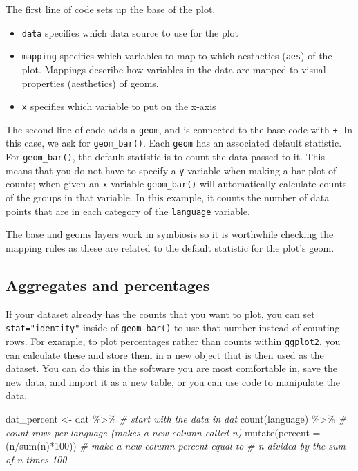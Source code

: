 \documentclass[
  english,
  doc,floatsintext]{apa6}
\newenvironment{Shaded}{\begin{snugshade}}{\end{snugshade}}
\newcommand{\AttributeTok}[1]{\textcolor[rgb]{0.77,0.63,0.00}{#1}}
\newcommand{\CommentTok}[1]{\textcolor[rgb]{0.56,0.35,0.01}{\textit{#1}}}
\newcommand{\DecValTok}[1]{\textcolor[rgb]{0.00,0.00,0.81}{#1}}
\newcommand{\FunctionTok}[1]{\textcolor[rgb]{0.00,0.00,0.00}{#1}}
\newcommand{\NormalTok}[1]{#1}
\newcommand{\OtherTok}[1]{\textcolor[rgb]{0.56,0.35,0.01}{#1}}
\newcommand{\SpecialCharTok}[1]{\textcolor[rgb]{0.00,0.00,0.00}{#1}}
\begin{document}
The first line of code sets up the base of the plot.

\begin{itemize}
\item
  \texttt{data} specifies which data source to use for the plot
\item
  \texttt{mapping} specifies which variables to map to which aesthetics (\texttt{aes}) of the plot. Mappings describe how variables in the data are mapped to visual properties (aesthetics) of geoms.
\item
  \texttt{x} specifies which variable to put on the x-axis
\end{itemize}

The second line of code adds a \texttt{geom}, and is connected to the base code with \texttt{+}. In this case, we ask for \texttt{geom\_bar()}. Each \texttt{geom} has an associated default statistic. For \texttt{geom\_bar()}, the default statistic is to count the data passed to it. This means that you do not have to specify a \texttt{y} variable when making a bar plot of counts; when given an \texttt{x} variable \texttt{geom\_bar()} will automatically calculate counts of the groups in that variable. In this example, it counts the number of data points that are in each category of the \texttt{language} variable.

The base and geoms layers work in symbiosis so it is worthwhile checking the mapping rules as these are related to the default statistic for the plot's geom.

\hypertarget{aggregates-and-percentages}{%
\subsection{Aggregates and percentages}\label{aggregates-and-percentages}}

If your dataset already has the counts that you want to plot, you can set \texttt{stat="identity"} inside of \texttt{geom\_bar()} to use that number instead of counting rows. For example, to plot percentages rather than counts within \texttt{ggplot2}, you can calculate these and store them in a new object that is then used as the dataset. You can do this in the software you are most comfortable in, save the new data, and import it as a new table, or you can use code to manipulate the data.

\begin{Shaded}
\begin{Highlighting}[]
\NormalTok{dat\_percent }\OtherTok{\textless{}{-}}\NormalTok{ dat }\SpecialCharTok{\%\textgreater{}\%}    \CommentTok{\# start with the data in dat}
  \FunctionTok{count}\NormalTok{(language) }\SpecialCharTok{\%\textgreater{}\%}     \CommentTok{\# count rows per language (makes a new column called n)}
  \FunctionTok{mutate}\NormalTok{(}\AttributeTok{percent =}\NormalTok{ (n}\SpecialCharTok{/}\FunctionTok{sum}\NormalTok{(n)}\SpecialCharTok{*}\DecValTok{100}\NormalTok{)) }\CommentTok{\# make a new column \textquotesingle{}percent\textquotesingle{} equal to }
                                   \CommentTok{\# n divided by the sum of n times 100}
\end{Highlighting}
\end{Shaded}
\end{document}
